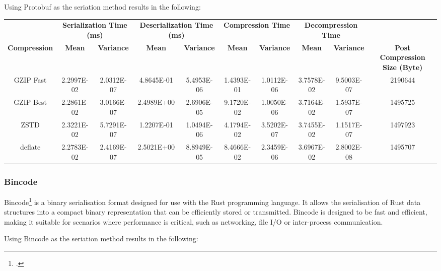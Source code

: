 Using Protobuf as the seriation method results in the following:

\begin{table}[h]
\centering
\begin{tabular}{cccccccccc}
\hline
 &
  \multicolumn{2}{c}{\textbf{Serialization Time (ms)}} &
  \multicolumn{2}{c}{\textbf{Deserialization Time (ms)}} &
  \multicolumn{2}{c}{\textbf{Compression Time}} &
  \multicolumn{2}{c}{\textbf{Decompression Time}} &
   \\
\textbf{Compression} & \textbf{Mean}     & \textbf{Variance} & \textbf{Mean}     & \textbf{Variance} & \textbf{Mean}     & \textbf{Variance} & \textbf{Mean}     & \textbf{Variance} & \textbf{Post Compression Size (Byte)} \\
\hline
GZIP Fast           & 2.2997E-02 & 2.0312E-07 & 4.8645E-01 & 5.4953E-06 & 1.4393E-01 & 1.0112E-06 & 3.7578E-02 & 9.5003E-07 & 2190644 \\
GZIP Best           & 2.2861E-02 & 3.0166E-07 & 2.4989E+00 & 2.6906E-05 & 9.1720E-02 & 1.0050E-06 & 3.7164E-02 & 1.5937E-07 & 1495725 \\
ZSTD                & 2.3221E-02 & 5.7291E-07 & 1.2207E-01 & 1.0494E-06 & 4.1794E-02 & 3.5202E-07 & 3.7455E-02 & 1.1517E-07 & 1497923 \\
deflate             & 2.2783E-02 & 2.4169E-07 & 2.5021E+00 & 8.8949E-05 & 8.4666E-02 & 2.3459E-06 & 3.6967E-02 & 2.8002E-08 & 1495707 \\
\hline
\end{tabular}
\end{table}

\subsubsection{Bincode}
Bincode\footcite{bincode} is a binary serialisation format designed for use with the Rust programming language. It allows the serialisation of Rust data structures into a compact binary representation that can be efficiently stored or transmitted. Bincode is designed to be fast and efficient, making it suitable for scenarios where performance is critical, such as networking, file I/O or inter-process communication.

Using Bincode as the seriation method results in the following:

